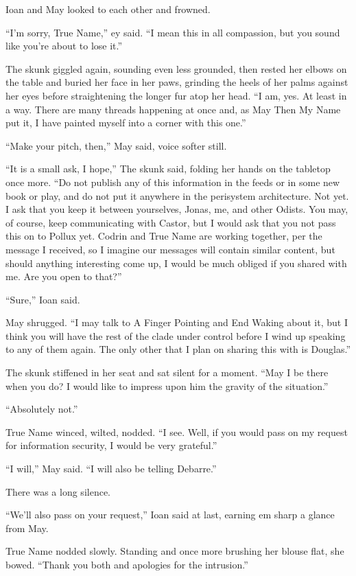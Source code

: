 Ioan and May looked to each other and frowned.

``I'm sorry, True Name,'' ey said. ``I mean this in all compassion, but you sound like you're about to lose it.''

The skunk giggled again, sounding even less grounded, then rested her elbows on the table and buried her face in her paws, grinding the heels of her palms against her eyes before straightening the longer fur atop her head. ``I am, yes. At least in a way. There are many threads happening at once and, as May Then My Name put it, I have painted myself into a corner with this one.''

``Make your pitch, then,'' May said, voice softer still.

``It is a small ask, I hope,'' The skunk said, folding her hands on the tabletop once more. ``Do not publish any of this information in the feeds or in some new book or play, and do not put it anywhere in the perisystem architecture. Not yet. I ask that you keep it between yourselves, Jonas, me, and other Odists. You may, of course, keep communicating with Castor, but I would ask that you not pass this on to Pollux yet. Codrin and True Name are working together, per the message I received, so I imagine our messages will contain similar content, but should anything interesting come up, I would be much obliged if you shared with me. Are you open to that?''

``Sure,'' Ioan said.

May shrugged. ``I may talk to A Finger Pointing and End Waking about it, but I think you will have the rest of the clade under control before I wind up speaking to any of them again. The only other that I plan on sharing this with is Douglas.''

The skunk stiffened in her seat and sat silent for a moment. ``May I be there when you do? I would like to impress upon him the gravity of the situation.''

``Absolutely not.''

True Name winced, wilted, nodded. ``I see. Well, if you would pass on my request for information security, I would be very grateful.''

``I will,'' May said. ``I will also be telling Debarre.''

There was a long silence.

``We'll also pass on your request,'' Ioan said at last, earning em sharp a glance from May.

True Name nodded slowly. Standing and once more brushing her blouse flat, she bowed. ``Thank you both and apologies for the intrusion.''

